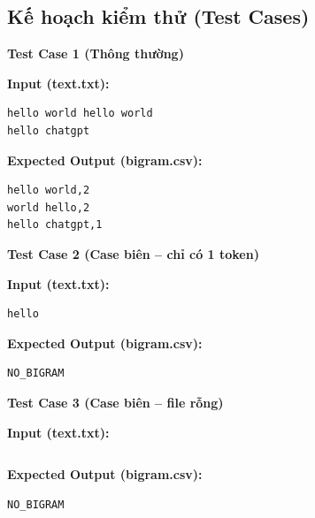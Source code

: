 \subsection{Kế hoạch kiểm thử (Test Cases)}

\textbf{Test Case 1 (Thông thường)}

\textbf{Input (text.txt):}

\begin{lstlisting}
hello world hello world
hello chatgpt
\end{lstlisting}

\textbf{Expected Output (bigram.csv):}

\begin{lstlisting}
hello world,2
world hello,2
hello chatgpt,1
\end{lstlisting}

\vspace{0.5cm}

\textbf{Test Case 2 (Case biên -- chỉ có 1 token)}

\textbf{Input (text.txt):}

\begin{lstlisting}
hello
\end{lstlisting}

\textbf{Expected Output (bigram.csv):}

\begin{lstlisting}
NO_BIGRAM
\end{lstlisting}

\vspace{0.5cm}

\textbf{Test Case 3 (Case biên -- file rỗng)}

\textbf{Input (text.txt):}

\begin{lstlisting}

\end{lstlisting}

\textbf{Expected Output (bigram.csv):}

\begin{lstlisting}
NO_BIGRAM
\end{lstlisting}